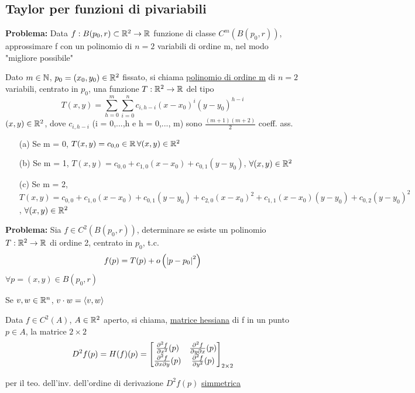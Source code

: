 \subsection{Taylor per funzioni di pi\acu variabili}
\textbf{Problema:} Data $f: B(p_0,r) \subset \mathbb{R}^2 \to \mathbb{R}$ funzione di classe $C^m\left(B(p_0,r)\right)$, 
approssimare f con un polinomio di $n=2$ variabili di ordine m, nel modo "migliore possibile"
\begin{definition}
  Dato $m \in \mathbb{N}$, $p_0 = (x_0,y_0) \in \mathbb{R}^2$ fissato, si chiama \underline{polinomio di ordine m} di $n=2$ variabili,
  centrato in $p_0$, una funzione $T: \mathbb{R}^2 \to \mathbb{R}$ del tipo
  $$T(x,y) = \sum_{h=0}^{m} \sum_{i = 0}^n c_{i,h-i} (x-x_0)^i(y-y_0)^{h-i}$$
  $(x,y)\in \mathbb{R}^2$, dove $c_{i,h-i}$ (i = 0,...,h e h = 0,..., m) sono $\frac{(m+1)(m+2)}{2}$ coeff. ass. 
\end{definition}
\begin{example}
  \begin{itemize}
    \item[(a)] Se m = 0, $T(x,y) = c_{0,0} \in \mathbb{R} \, \forall (x,y) \in \mathbb{R}^2$
    \item[(b)] Se m = 1, $T(x,y) = c_{0,0} + c_{1,0}(x-x_0)+ c_{0,1}(y-y_0)$, $\forall (x,y)\in \mathbb{R}^2$
    \item[(c)] Se m = 2, $T(x,y) = c_{0,0} + c_{1,0}(x-x_0)+ c_{0,1}(y-y_0) + c_{2,0}(x-x_0)^2 + c_{1,1}(x-x_0)(y-y_0)
                + c_{0,2}(y-y_0)^2$, $\forall (x,y)\in \mathbb{R}^2$  
  \end{itemize}
\end{example}
\textbf{Problema:} Sia $f \in C^2\left(B(p_0,r)\right)$, determinare se esiste un polinomio $T: \mathbb{R}^2 \to \mathbb{R}$ di 
ordine 2, centrato in $p_0$, t.c. $$f(p) = T(p) + o\left(\left\lvert p-p_0 \right\rvert^2\right)$$
$\forall p = (x,y) \in B(p_0,r)$
\begin{notazione}
  Se $v,w \in \mathbb{R}^n$, $v \cdot w = \left\langle v,w \right\rangle$
\end{notazione}
\begin{definition}
  Data $f \in C^2(A)$, $A \in \mathbb{R}^2$ aperto, si chiama, \underline{matrice hessiana}
  di f in un punto $p\in A$, la matrice $2\times 2$
  $$D^2f(p) = H(f)(p) = \begin{bmatrix}
    \frac{\partial^2 f}{\partial x^2}(p) & \frac{\partial^2 f}{\partial y \partial x}(p) \\
    \frac{\partial^2 f}{\partial x \partial y}(p) & \frac{\partial^2 f}{\partial y^2}(p) \\
  \end{bmatrix}_{2\times 2}$$
\end{definition}
\begin{osservazione}
  per il teo. dell'inv. dell'ordine di derivazione $D^2 f(p)$ \ace \underline{simmetrica}
\end{osservazione}
